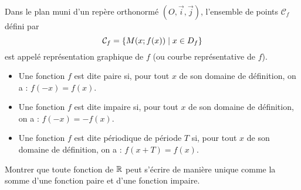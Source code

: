 \begin{defi}
	Dans le plan muni d’un repère orthonormé \((O, \vec{i}, \vec{j})\), l’ensemble de points \(\mathcal{C}_f\) défini par
	\[
		\mathcal{C}_f = \left\lbrace M(x; f(x)) \;\middle|\; x \in D_f \right\rbrace
	\]
	est appelé représentation graphique de \(f\) (ou courbe représentative de \(f\)).
\end{defi}

\begin{defi}
	\begin{itemize}
		\item Une fonction \(f\) est dite paire si, pour tout \(x\) de son domaine de définition, on a : \(f(-x) = f(x)\).
		\item Une fonction \(f\) est dite impaire si, pour tout \(x\) de son domaine de définition, on a : \(f(-x) = -f(x)\).
		\item Une fonction \(f\) est dite périodique de période \(T\) si, pour tout \(x\) de son domaine de définition, on a : \(f(x+T) = f(x)\).
	\end{itemize}
\end{defi}
\begin{exo}
	Montrer que toute fonction de \(\mathbb{R}\) peut s'écrire de manière unique comme la somme d'une fonction paire et d'une fonction impaire.
\end{exo}

